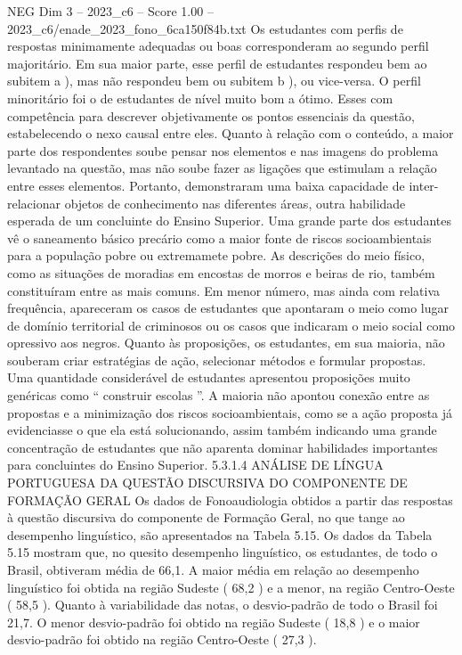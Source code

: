 \begin{textsample}{NEG Dim 3 – 2023\_c6 – Score 1.00 – 2023\_c6/enade\_2023\_fono\_6ca150f84b.txt}
Os estudantes com perfis de respostas minimamente adequadas ou boas corresponderam ao segundo perfil majoritário.
Em sua maior parte, esse perfil de estudantes respondeu bem ao subitem a ), mas não respondeu bem ou subitem b ), ou vice-versa.
O perfil minoritário foi o de estudantes de nível muito bom a ótimo.
Esses com competência para descrever objetivamente os pontos essenciais da questão, estabelecendo o nexo causal entre eles.
Quanto à relação com o conteúdo, a maior parte dos respondentes soube pensar nos elementos e nas imagens do problema levantado na questão, mas não soube fazer as ligações que estimulam a relação entre esses elementos.
Portanto, demonstraram uma baixa capacidade de inter-relacionar objetos de conhecimento nas diferentes áreas, outra habilidade esperada de um concluinte do Ensino Superior.
Uma grande parte dos estudantes vê o saneamento básico precário como a maior fonte de riscos socioambientais para a população pobre ou extremamete pobre.
As descrições do meio físico, como as situações de moradias em encostas de morros e beiras de rio, também constituíram entre as mais comuns.
Em menor número, mas ainda com relativa frequência, apareceram os casos de estudantes que apontaram o meio como lugar de domínio territorial de criminosos ou os casos que indicaram o meio social como opressivo aos negros.
Quanto às proposições, os estudantes, em sua maioria, não souberam criar estratégias de ação, selecionar métodos e formular propostas.
Uma quantidade considerável de estudantes apresentou proposições muito genéricas como “ construir escolas ”.
A maioria não apontou conexão entre as propostas e a minimização dos riscos socioambientais, como se a ação proposta já evidenciasse o que ela está solucionando, assim também indicando uma grande concentração de estudantes que não aparenta dominar habilidades importantes para concluintes do Ensino Superior. 5.3.1.4 ANÁLISE DE LÍNGUA PORTUGUESA DA QUESTÃO DISCURSIVA DO COMPONENTE DE FORMAÇÃO GERAL Os dados de Fonoaudiologia obtidos a partir das respostas à questão discursiva do componente de Formação Geral, no que tange ao desempenho linguístico, são apresentados na Tabela 5.15.
Os dados da Tabela 5.15 mostram que, no quesito desempenho linguístico, os estudantes, de todo o Brasil, obtiveram média de 66,1.
A maior média em relação ao desempenho linguístico foi obtida na região Sudeste ( 68,2 ) e a menor, na região Centro-Oeste ( 58,5 ).
Quanto à variabilidade das notas, o desvio-padrão de todo o Brasil foi 21,7.
O menor desvio-padrão foi obtido na região Sudeste ( 18,8 ) e o maior desvio-padrão foi obtido na região Centro-Oeste ( 27,3 ).

\end{textsample}
